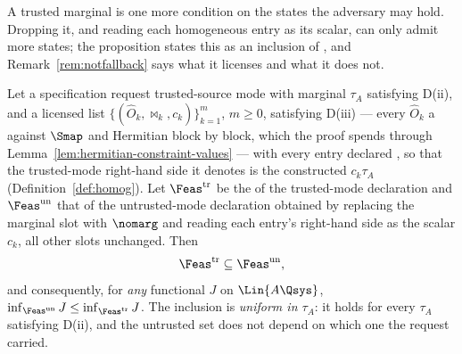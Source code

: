 
A trusted marginal is one more condition on the states the adversary may
hold. Dropping it, and reading each homogeneous entry as its scalar, can only
admit more states; the proposition states this as an inclusion of
, and Remark~\ref{rem:notfallback} says what it licenses and what it does
not.

\begin{proposition}\label{prop:conservative}
Let a specification request trusted-source mode with marginal $\tau_A$
satisfying D(ii), and a licensed list
$\{(\hat O_k,\bowtie_k,c_k)\}_{k=1}^{m}$, $m\ge0$, satisfying D(iii) --- every
$\hat O_k$ a  against $\Smap$ and Hermitian block by block,
which the proof spends through Lemma~\ref{lem:hermitian-constraint-values} ---
with every entry declared , so that the trusted-mode
right-hand side it denotes is the constructed $c_k\tau_A$
(Definition~\ref{def:homog}). Let $\Feas^{\mathrm{tr}}$ be the
 of the trusted-mode declaration and $\Feas^{\mathrm{un}}$
that of the untrusted-mode declaration obtained by replacing the marginal
slot with $\nomarg$ and reading each entry's right-hand side as the scalar
$c_k$, all other slots unchanged. Then
\begin{equation}\label{eq:inclusion}
  \Feas^{\mathrm{tr}}\subseteq\Feas^{\mathrm{un}} ,
\end{equation}
and consequently, for \emph{any} functional $J$ on $\Lin{A\Qsys}$,
$\inf_{\Feas^{\mathrm{un}}}J\le\inf_{\Feas^{\mathrm{tr}}}J$. The inclusion is
\emph{uniform in $\tau_A$}: it holds for every $\tau_A$ satisfying D(ii), and
the untrusted set does not depend on which one the request carried.
\end{proposition}

